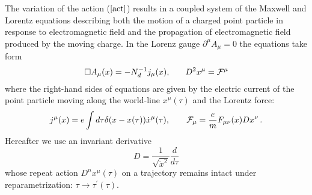 \documentclass[a4paper,12pt]{article}
\begin{document}
The variation of the action ($\ref{act}$) results in a coupled system of the
Maxwell and Lorentz equations describing both the motion of a charged point
particle in response to electromagnetic field and the propagation of
electromagnetic field produced by the moving charge. In the Lorenz gauge $%
\partial ^\mu A_\mu =0$ the equations take form
\begin{equation}
\square A_\mu (x)=-N_d^{-1}j_\mu (x),\,\,\,\,\;\;\;\;D^2x^\mu ={\cal F}^\mu
\label{eq}
\end{equation}
where the right-hand sides of equations are given by the electric current of
the point particle moving along the world-line $x^\mu (\tau )$ and the
Lorentz force:
\begin{equation}
j^\mu (x)=e\int {d\tau \delta (x-x(\tau ))\dot x^\mu (\tau )}%
,\,\,\,\,\,\;\;\;\;{\cal F}_\mu =\frac emF_{\mu \nu }(x)Dx^\nu \,.
\label{jf}
\end{equation}
Hereafter we use an invariant derivative
\begin{equation}
D=\frac 1{\sqrt{\dot x^2}}\frac d{d\tau }  \label{der}
\end{equation}
whose repeat action $D^nx^\mu (\tau )$ on a trajectory remains intact under
reparametrization: $\tau \rightarrow \tau ^{\prime }(\tau )$.
\end{document}
